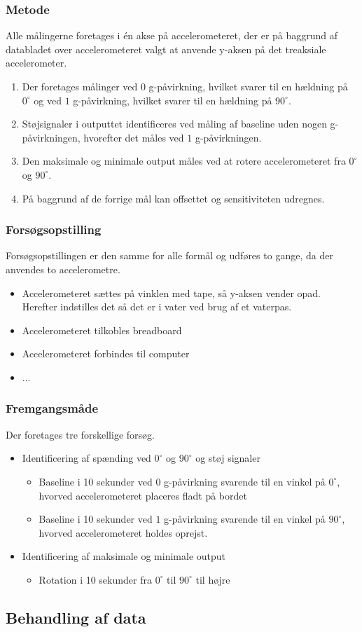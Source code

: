 \subsubsection{Metode}
Alle målingerne foretages i én akse på accelerometeret, der er på baggrund af databladet over accelerometeret valgt at anvende y-aksen på det treaksiale accelerometer. 
\begin{enumerate}
\item Der foretages målinger ved $0$ g-påvirkning, hvilket svarer til en hældning på $0^{\circ}$ og ved $1$ g-påvirkning, hvilket svarer til en hældning på $90^{\circ}$. 
\item Støjsignaler i outputtet identificeres ved måling af baseline uden nogen g-påvirkningen, hvorefter det måles ved $1$ g-påvirkningen. 
\item Den maksimale og minimale output måles ved at rotere accelerometeret fra $0^{\circ}$ og $90^{\circ}$.
\item På baggrund af de forrige mål kan offsettet og sensitiviteten udregnes.
\end{enumerate}

\subsubsection{Forsøgsopstilling}
Forsøgsopstillingen er den samme for alle formål og udføres to gange, da der anvendes to accelerometre.
\begin{itemize}
\item Accelerometeret sættes på vinklen med tape, så y-aksen vender opad. Herefter indstilles det så det er i vater ved brug af et vaterpas.
\item Accelerometeret tilkobles breadboard
\item Accelerometeret forbindes til computer
\item ...
\end{itemize}

\subsubsection{Fremgangsmåde}
Der foretages tre forskellige forsøg.
\begin{itemize}
\item Identificering af spænding ved $0^{\circ}$ og $90^{\circ}$ og støj signaler
\begin{itemize}
\item Baseline i 10 sekunder ved $0$ g-påvirkning svarende til en vinkel på $0^{\circ}$, hvorved accelerometeret placeres fladt på bordet
\item Baseline i 10 sekunder ved $1$ g-påvirkning svarende til en vinkel på $90^{\circ}$, hvorved accelerometeret holdes oprejst.
\end{itemize}
\item Identificering af maksimale og minimale output 
\begin{itemize}
\item Rotation i 10 sekunder fra $0^{\circ}$ til $90^{\circ}$ til højre
\end{itemize}
\end{itemize}


\subsection{Behandling af data}

